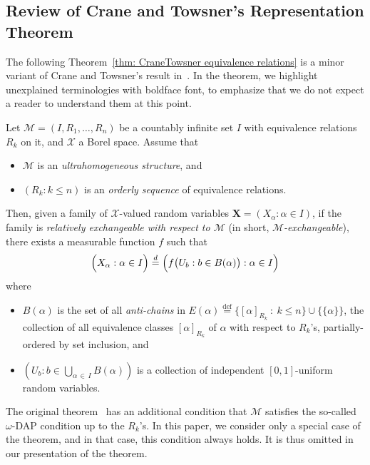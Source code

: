 \documentclass[AHL,Unicode,longabstracts,published]{cedram}
\newcommand*{\defeq}{\stackrel{\mathrm{def}}{=}}
\renewcommand{\d}{\buildrel{d}\over{=}}
\newcommand*\XX{{\mathcal{X}}}
\newcommand*\MM{\mathcal{M}}
\newcommand*\bX{\mathbf{X}}
\begin{document}
\subsection{Review of Crane and Towsner's Representation Theorem}

The following Theorem~\ref{thm: CraneTowsner equivalence relations} is a minor variant of Crane and Towsner's result in~\cite{crane2018relatively}. In the theorem, we highlight unexplained terminologies with boldface font, to emphasize that we do not expect a reader to understand them at this point.
\begin{theo}\label{thm: CraneTowsner equivalence relations}
Let $\MM=(I,R_1,\ldots,R_n)$ be a countably infinite set $I$ with equivalence relations $R_k$ on it, and $\XX$ a Borel space. Assume that
\begin{itemize}
\item $\MM$ is an \emph{ultrahomogeneous structure}, and
\item $(R_k : k \leq n)$ is an \emph{orderly sequence} of equivalence relations.
\end{itemize}
Then, given a family of $\XX$-valued random variables $\bX = (X_\alpha : \alpha \in I)$, if the family is \emph{relatively exchangeable with respect to $\MM$} (in short, \emph{$\MM$-exchangeable}), there exists a measurable function $f$ such that
\begin{equation}\label{equation: CraneTowsner representation with equivalence relations}
\Big(X_\alpha : \alpha \in I\Big) \d \Big(f\big(U_b : b \in B(\alpha)\big) : \alpha \in I\Big)
\end{equation}
where
\begin{itemize}
\item $B(\alpha)$ is the set of all \emph{anti-chains} in $E(\alpha)
\defeq \{[\alpha]_{R_k}~:~k\leq n\}\cup\{\{\alpha\}\}$, the collection of all equivalence classes $[\alpha]_{R_k}$ of $\alpha$ with respect to $R_k$'s, partially-ordered by set inclusion, and
\item $(U_b : b \in \bigcup_{\alpha\,\in\,I} B(\alpha))$ is a collection of independent $[0,1]$-uniform random variables.
\end{itemize}
\end{theo}

\begin{rema}
The original theorem~\cite{crane2018relatively} has an additional condition that $\MM$ satisfies the so-called $\omega$-DAP condition up to the $R_k$'s. In this paper, we consider only a special case of the theorem, and in that case, this condition always holds. It is thus omitted in our presentation of the theorem.
\end{rema}
\end{document}
